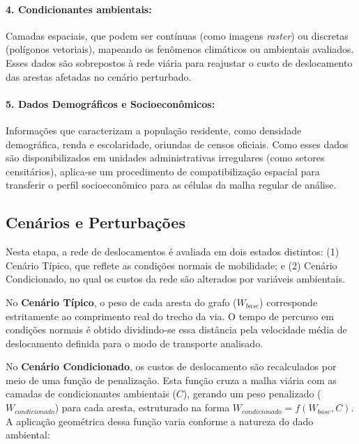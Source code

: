 \paragraph{4. Condicionantes ambientais:} Camadas espaciais, que podem ser contínuas (como imagens \textit{raster}) ou discretas (polígonos vetoriais), mapeando os fenômenos climáticos ou ambientais avaliados. Esses dados são sobrepostos à rede viária para reajustar o custo de deslocamento das arestas afetadas no cenário perturbado.

\paragraph{5. Dados Demográficos e Socioeconômicos:} Informações que caracterizam a população residente, como densidade demográfica, renda e escolaridade, oriundas de censos oficiais. Como esses dados são disponibilizados em unidades administrativas irregulares (como setores censitários), aplica-se um procedimento de compatibilização espacial para transferir o perfil socioeconômico para as células da malha regular de análise.

\subsection{Cenários e Perturbações}
\label{subsec:scenarios}

Nesta etapa, a rede de deslocamentos é avaliada em dois estados distintos: (1) Cenário Típico, que reflete as condições normais de mobilidade; e (2) Cenário Condicionado, no qual os custos da rede são alterados por variáveis ambientais.

No \textbf{Cenário Típico}, o peso de cada aresta do grafo ($W_{base}$) corresponde estritamente ao comprimento real do trecho da via. O tempo de percurso em condições normais é obtido dividindo-se essa distância pela velocidade média de deslocamento definida para o modo de transporte analisado.

No \textbf{Cenário Condicionado}, os custos de deslocamento são recalculados por meio de uma função de penalização. Esta função cruza a malha viária com as camadas de condicionantes ambientais ($C$), gerando um peso penalizado ($W_{condicionado}$) para cada aresta, estruturado na forma $W_{condicionado} = f(W_{base}, C)$. A aplicação geométrica dessa função varia conforme a natureza do dado ambiental:

